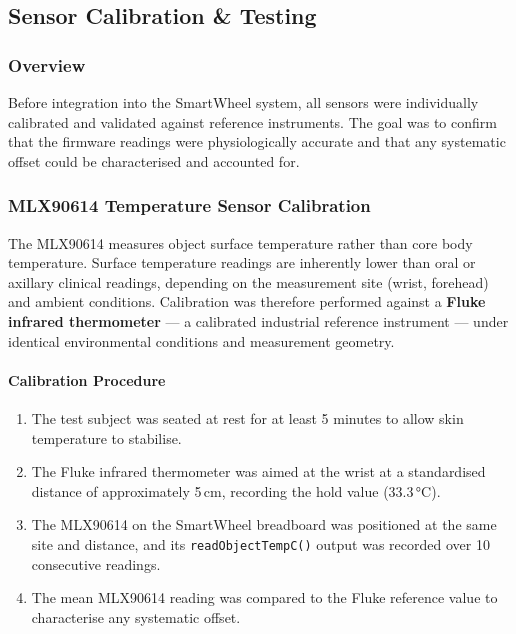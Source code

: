 \documentclass[12pt,a4paper]{report}
\begin{document}
\subsection{Sensor Calibration \& Testing}

\subsubsection{Overview}

Before integration into the SmartWheel system, all sensors were individually calibrated
and validated against reference instruments. The goal was to confirm that the firmware
readings were physiologically accurate and that any systematic offset could be characterised
and accounted for.

\subsubsection{MLX90614 Temperature Sensor Calibration}

The MLX90614 measures object surface temperature rather than core body temperature.
Surface temperature readings are inherently lower than oral or axillary clinical readings,
depending on the measurement site (wrist, forehead) and ambient conditions.
Calibration was therefore performed against a \textbf{Fluke infrared thermometer}
— a calibrated industrial reference instrument — under identical environmental conditions
and measurement geometry.


\paragraph{Calibration Procedure}

\begin{enumerate}[leftmargin=*]
  \item The test subject was seated at rest for at least 5 minutes to allow skin
        temperature to stabilise.
  \item The Fluke infrared thermometer was aimed at the wrist at a standardised
        distance of approximately 5\,cm, recording the hold value (33.3\,°C).
  \item The MLX90614 on the SmartWheel breadboard was positioned at the same
        site and distance, and its \texttt{readObjectTempC()} output was recorded
        over 10 consecutive readings.
  \item The mean MLX90614 reading was compared to the Fluke reference value to
        characterise any systematic offset.
\end{enumerate}
\end{document}

